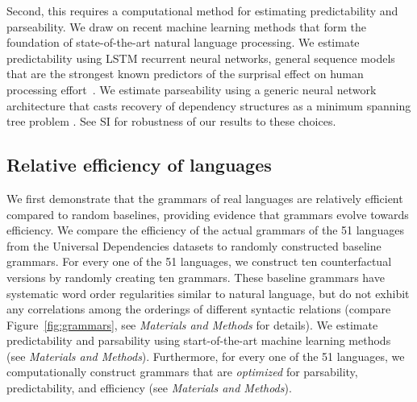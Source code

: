 \documentclass[9pt,twocolumn,twoside,lineno]{pnas-new}
\begin{document}
Second, this requires a computational method for estimating predictability and parseability.
We draw on recent machine learning methods that form the foundation of state-of-the-art natural language processing.
We estimate predictability using LSTM recurrent neural networks, general sequence models that are the strongest known predictors of the surprisal effect on human processing effort~\citep{frank2011insensitivity,goodkind2018predictive}.
We estimate parseability using a generic neural network architecture that casts recovery of dependency structures as a minimum spanning tree problem \citep{dozat2017stanford, zhang2017dependency}.
See SI for robustness of our results to these choices.

\subsection{Relative efficiency of languages}
\label{sec:relative-efficiency}



We first demonstrate that the grammars of real languages are relatively efficient compared to random baselines, providing evidence that grammars evolve towards efficiency.
We compare the efficiency of the actual grammars of the 51 languages from the Universal Dependencies datasets to randomly constructed baseline grammars.
For every one of the 51 languages, we construct ten counterfactual versions by randomly creating ten grammars.
These baseline grammars have systematic word order regularities similar to natural language, but do not exhibit any correlations among the orderings of different syntactic relations (compare Figure~\ref{fig:grammars}, see \textit{Materials and Methods} for details).
We estimate predictability and parsability using start-of-the-art machine learning methods (see \textit{Materials and Methods}).
Furthermore, for every one of the 51 languages, we computationally construct grammars that are \emph{optimized} for parsability, predictability, and efficiency (see \textit{Materials and Methods}).
\end{document}
